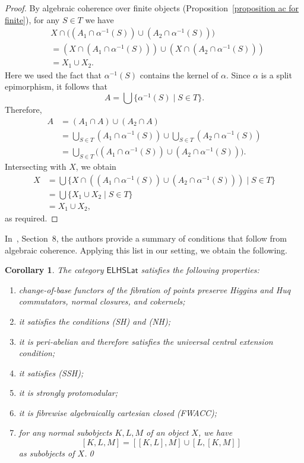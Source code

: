 \documentclass[reqno,a4paper]{amsart}
\newtheorem{corollary}[lemma]{Corollary}
\theoremstyle{remark}
\theoremstyle{definition}
\newcommand{\noproof}{\hfill \qed}
\newcommand{\FWACC}{{\rm (FWACC)}}
\newcommand{\NH}{{\rm (NH)}}
\newcommand{\SH}{{\rm (SH)}}
\newcommand{\SSH}{{\rm (SSH)}}
\newcommand{\omeet}{\cap} %
\newcommand{\bigojoin}{\bigcup} %
\newcommand{\ojoin}{\cup}  %
\newcommand{\ELHSLat}{\ensuremath{\mathsf{ELHSLat}}}
\begin{document}
\begin{proof}
	By algebraic coherence over finite objects (Proposition~\ref{proposition ac for finite}), for any \(S \in T\) we have
	\begin{align*}
		 & X \omeet \bigl((A_1 \omeet \alpha^{-1}(S)) \ojoin (A_2 \omeet \alpha^{-1}(S))\bigr)    \\
		 & = (X \omeet (A_1 \omeet \alpha^{-1}(S))) \ojoin (X \omeet (A_2 \omeet \alpha^{-1}(S))) \\
		 & = X_1 \ojoin X_2 .
	\end{align*}
	Here we used the fact that \(\alpha^{-1}(S)\) contains the kernel of \(\alpha\).
	Since \(\alpha\) is a split epimorphism, it follows that
	\[
		A = \bigcup \{ \alpha^{-1}(S) \mid S \in T \}.
	\]
	Therefore,
	\begin{align*}
		A
		 & = (A_1 \omeet A) \ojoin (A_2 \omeet A)                                                                   \\
		 & = \bigojoin_{S \in T} (A_1 \omeet \alpha^{-1}(S)) \ojoin \bigojoin_{S \in T} (A_2 \omeet \alpha^{-1}(S)) \\
		 & = \bigojoin_{S \in T} \bigl((A_1 \omeet \alpha^{-1}(S)) \ojoin (A_2 \omeet \alpha^{-1}(S))\bigr).
	\end{align*}
	Intersecting with \(X\), we obtain
	\begin{align*}
		X
		 & = \bigcup \{ X \omeet ((A_1 \omeet \alpha^{-1}(S)) \ojoin (A_2 \omeet \alpha^{-1}(S))) \mid S \in T \} \\
		 & = \bigcup \{ X_1 \ojoin X_2 \mid S \in T \}                                                            \\
		 & = X_1 \ojoin X_2,
	\end{align*}
	as required.
\end{proof}

In~\cite{acc}, Section~8, the authors provide a summary of conditions that follow from algebraic coherence.
Applying this list in our setting, we obtain the following.

\begin{corollary}
	The category \(\ELHSLat\) satisfies the following properties:
	\begin{enumerate}
		\item change-of-base functors of the fibration of points preserve Higgins and Huq commutators, normal closures, and cokernels;
		\item it satisfies the conditions \SH{} and \NH{};
		\item it is peri-abelian and therefore satisfies the universal central extension condition;
		\item it satisfies \SSH{};
		\item it is strongly protomodular;
		\item it is fibrewise algebraically cartesian closed \FWACC{};
		\item for any normal subobjects \(K,L,M\) of an object \(X\), we have
		      \[
			      [K,L,M] = [[K,L],M] \ojoin [L,[K,M]]
		      \]
		      as subobjects of \(X\).\noproof
	\end{enumerate}
\end{corollary}
\end{document}

